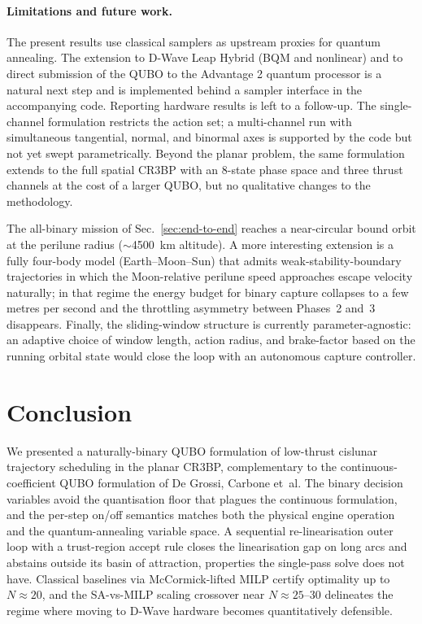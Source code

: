 \documentclass[11pt,a4paper]{article}
\theoremstyle{plain}
\begin{document}
\paragraph{Limitations and future work.} The present results use
classical samplers as upstream proxies for quantum
annealing. The extension to D-Wave Leap Hybrid (BQM and
nonlinear) and to direct submission of the QUBO to the
Advantage 2 quantum processor is a natural next step and is
implemented behind a sampler interface in the accompanying code.
Reporting hardware results is left to a follow-up.
The single-channel formulation restricts the action set; a
multi-channel run with simultaneous tangential, normal, and
binormal axes is supported by the code but not yet swept
parametrically. Beyond the planar problem, the same
formulation extends to the full spatial CR3BP with an 8-state
phase space and three thrust channels at the cost of a larger
QUBO, but no qualitative changes to the methodology.

The all-binary mission of Sec.~\ref{sec:end-to-end} reaches a
near-circular bound orbit at the perilune radius
($\sim$\SI{4500}{\km} altitude). A more interesting
extension is a fully four-body model (Earth--Moon--Sun) that
admits weak-stability-boundary trajectories in which the
Moon-relative perilune speed approaches escape velocity
naturally; in that regime the energy budget for binary capture
collapses to a few metres per second and the throttling
asymmetry between Phases~2 and~3 disappears. Finally, the
sliding-window structure is currently parameter-agnostic: an
adaptive choice of window length, action radius, and
brake-factor based on the running orbital state would close
the loop with an autonomous capture controller.

\section{Conclusion}\label{sec:conclusion}

We presented a naturally-binary QUBO formulation of low-thrust
cislunar trajectory scheduling in the planar CR3BP, complementary
to the continuous-coefficient QUBO formulation of De Grossi,
Carbone et~al. The binary decision variables avoid the
quantisation floor that plagues the continuous formulation, and
the per-step on/off semantics matches both the physical engine
operation and the quantum-annealing variable space. A
sequential re-linearisation outer loop with a trust-region
accept rule closes the linearisation gap on long arcs and
abstains outside its basin of attraction, properties the
single-pass solve does not have. Classical baselines via
McCormick-lifted MILP certify optimality up to
$N \approx 20$, and the SA-vs-MILP scaling crossover near
$N \approx 25$--$30$ delineates the regime where moving to
D-Wave hardware becomes quantitatively defensible.
\end{document}

